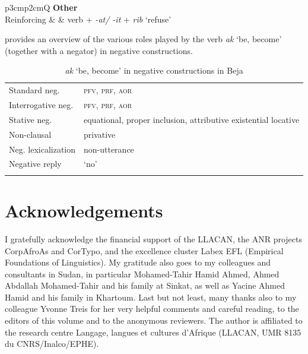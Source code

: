 \documentclass[output=paper,colorlinks,citecolor=brown]{langscibook}
\begin{document}
\begin{table}
\begin{tabularx}{\textwidth}{p{3cm}p{2cm}Q}
\midrule
\textbf{Other}\\
\midrule
{Reinforcing} &  & {verb + \textit{-at/ -it}  + \textit{rib} ‘refuse’}\\
\lspbottomrule
\end{tabularx}
\caption{Negative strategies in Beja}
\label{tab:beja:5}
\end{table}

 provides an overview of the various roles played by the verb \textit{ak} ‘be, become’ (together with a negator) in negative constructions.

\begin{table}
\begin{tabularx}{\textwidth}{lX}
\lsptoprule
Standard neg. & \textsc{pfv},  \textsc{prf},  \textsc{aor} \\
Interrogative neg. &\textsc{pfv},  \textsc{prf},  \textsc{aor} \\
Stative neg. & equational,  proper inclusion, attributive existential locative  \\
Non-clausal & privative \\
Neg. lexicalization &non-utterance \\
Negative reply & ‘no’ \\
\lspbottomrule
\end{tabularx}

\caption{\textit{ak} ‘be, become’ in negative constructions in Beja}
\label{tab:beja:6}
\end{table}

\section*{Acknowledgements}

I gratefully acknowledge the financial support of the LLACAN, the ANR projects CorpAfroAs and CorTypo, and the excellence cluster Labex EFL (Empirical Foundations of Linguistics). My gratitude also goes to my colleagues and consultants in Sudan, in particular Mohamed-Tahir Hamid Ahmed, Ahmed Abdallah Mo\-hamed-Tahir and his family at Sinkat, as well as Yacine Ahmed Hamid and his family in Khartoum. Last but not least, many thanks also to my colleague Yvonne Treis for her very helpful comments and careful reading, to the editors of this volume and to the anonymous reviewers. The author is affiliated to the research centre Langage, langues et cultures d’Afrique (LLACAN, UMR 8135 du CNRS/Inalco/EPHE).

\newpage 
\end{document}

